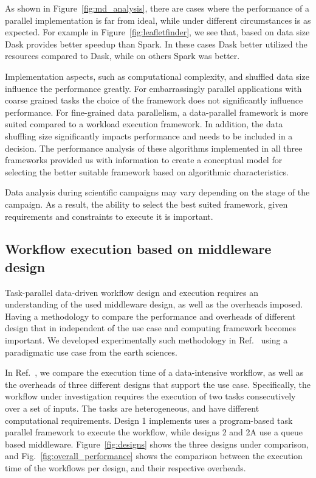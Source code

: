 As shown in Figure~\ref{fig:md_analysis}, there are cases where the performance of a parallel implementation is far from ideal, while under different circumstances is as expected. 
For example in Figure~\ref{fig:leafletfinder}, we see that, based on data size Dask provides better speedup than Spark. 
In these cases Dask better utilized the resources compared to Dask, while on others Spark was better.

Implementation aspects, such as computational complexity, and shuffled data size influence the performance greatly. 
For embarrassingly parallel applications with coarse grained tasks the choice of the framework does not significantly influence performance. 
For fine-grained data parallelism, a data-parallel framework is more suited compared to a workload execution framework. 
In addition, the data shuffling size significantly impacts performance and needs to be included in a decision.
The performance analysis of these algorithms implemented in all three frameworks provided us with information to create a conceptual model for selecting the better suitable framework based on algorithmic characteristics.

Data analysis during scientific campaigns may vary depending on the stage of the campaign. 
As a result, the ability to select the best suited framework, given requirements and constraints to execute it is important. 

\subsection{Workflow execution based on middleware design}
\label{design_comp}
Task-parallel data-driven workflow design and execution requires an understanding of the used middleware design, as well as the overheads imposed.
Having a methodology to compare the performance and overheads of different design that in independent of the use case and computing framework becomes important.
We developed experimentally such methodology in Ref.~\cite{paraskevakos2019workflow} using a paradigmatic use case from the earth sciences.

In Ref.~\cite{paraskevakos2019workflow}, we compare the execution time of a data-intensive workflow, as well as the overheads of three different designs that support the use case.
Specifically, the workflow under investigation requires the execution of two tasks consecutively over a set of inputs. 
The tasks are heterogeneous, and have different computational requirements. 
Design 1 implements uses a program-based task parallel framework to execute the workflow, while designs 2 and 2A use a queue based middleware.
Figure~\ref{fig:designs} shows the three designs under comparison, and Fig.~\ref{fig:overall_performance} shows the comparison between the execution time of the workflows per design, and their respective overheads.

